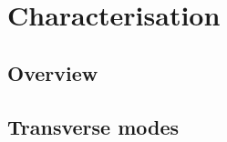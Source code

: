 \documentclass[../Thesis-IJspeert.tex]{subfiles}
\begin{document}
\section{Characterisation}

\subsection{Overview}

\subsection{Transverse modes}
\end{document}
